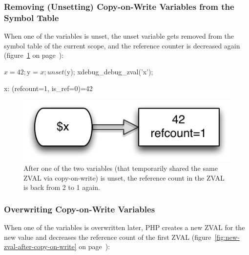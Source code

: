 \subsubsection{Removing (Unsetting) Copy-on-Write Variables from the Symbol Table}
\label{sec:unsetting}

When one of the variables is unset, the unset variable gets removed from the symbol table of the current scope, and the reference counter is decreased again (figure~\ref{fig:reference-count-decreased} on page~\pageref{fig:reference-count-decreased}):

\begin{phpcode}
$x = 42;
$y = $x;
unset($y);
xdebug_debug_zval('x');
\end{phpcode}

\begin{textcode}
x: (refcount=1, is_ref=0)=42
\end{textcode}

\begin{figure}[htb]
  \begin{center}
    \includegraphics[scale=0.8]{images/x_42}
    \caption{After one of the two variables (that temporarily shared the same ZVAL via copy-on-write) is unset, the reference count in the ZVAL is back from 2 to 1 again.}
    \label{fig:reference-count-decreased}
  \end{center}
\end{figure}


\subsubsection{Overwriting Copy-on-Write Variables}
\label{sec:overwriting}

When one of the variables is overwritten later, PHP creates a new ZVAL for the new value and decreases the reference count of the first ZVAL (figure~\ref{fig:new-zval-after-copy-on-write} on page~\pageref{fig:new-zval-after-copy-on-write}):

